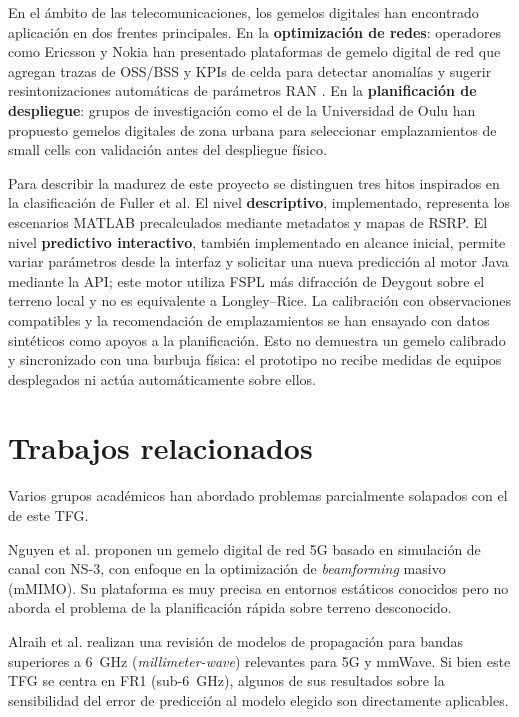 En el ámbito de las telecomunicaciones, los gemelos digitales han encontrado aplicación en
dos frentes principales. En la \textbf{optimización de redes}: operadores como Ericsson y
Nokia han presentado plataformas de gemelo digital de red que agregan trazas de OSS/BSS y
KPIs de celda para detectar anomalías y sugerir resintonizaciones automáticas de parámetros
RAN \cite{itu2021dt_networks}. En la \textbf{planificación de despliegue}: grupos de
investigación como el de la Universidad de Oulu han propuesto gemelos digitales de zona
urbana para seleccionar emplazamientos de small cells con validación antes del despliegue
físico.

Para describir la madurez de este proyecto se distinguen tres hitos inspirados en la
clasificación de Fuller et al. El nivel \textbf{descriptivo}, implementado, representa los
escenarios MATLAB precalculados mediante metadatos y mapas de RSRP. El nivel
\textbf{predictivo interactivo}, también implementado en alcance inicial, permite variar
parámetros desde la interfaz y solicitar una nueva predicción al motor Java mediante la API;
este motor utiliza FSPL más difracción de Deygout sobre el terreno local y no es equivalente
a Longley--Rice. La calibración con observaciones compatibles y la recomendación de
emplazamientos se han ensayado con datos sintéticos como apoyos a la planificación.
Esto no demuestra un gemelo calibrado y sincronizado con una burbuja física: el
prototipo no recibe medidas de equipos desplegados ni actúa automáticamente sobre ellos.

\section{Trabajos relacionados}
\label{sec:relacionados}

Varios grupos académicos han abordado problemas parcialmente solapados con el de este TFG.

Nguyen et al. \cite{nguyen2021digital} proponen un gemelo digital de red 5G basado en
simulación de canal con NS-3, con enfoque en la optimización de \textit{beamforming}
masivo (mMIMO). Su plataforma es muy precisa en entornos estáticos conocidos pero no
aborda el problema de la planificación rápida sobre terreno desconocido.

Alraih et al. \cite{alraih2022survey} realizan una revisión de modelos de propagación para
bandas superiores a 6~GHz (\textit{millimeter-wave}) relevantes para 5G y mmWave. Si bien
este TFG se centra en FR1 (sub-6~GHz), algunos de sus resultados sobre la sensibilidad del
error de predicción al modelo elegido son directamente aplicables.

